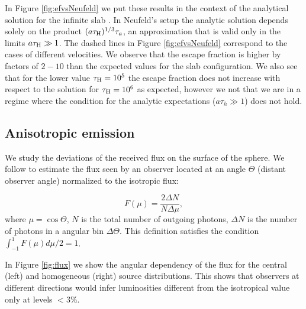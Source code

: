 \documentclass[usenatbib]{mn2e}
\begin{document}


In Figure \ref{fig:efvsNeufeld} we put these results in the context of
the analytical solution for the infinite slab \citep{Neufeld90}. In
Neufeld's setup the analytic solution depends solely on the product
$(a\tau_{\rm   H})^{1/3}\tau_{a}$, an approximation that is valid only
in the limits $a\tau_{\rm   H}\gg 1$. The dashed lines in Figure
\ref{fig:efvsNeufeld} correspond to the cases of different
velocities. We observe that the escape fraction is higher
by factors of $2-10$  than the expected values for the slab
configuration. We also see that for the lower value $\tau_{\rm
  H}=10^{5}$ the escape fraction does not increase with respect to the
solution for $\tau_{\rm H}=10^{6}$ as expected, however we not that we
are in a regime where the condition for the analytic expectations 
($a\tau_{h}\gg 1$) does not hold.



\subsection{Anisotropic emission}

We study the deviations of the received flux on the surface of the
sphere. We follow \cite{Zheng2013} to estimate the flux seen by an
observer located at an angle $\Theta$ (distant observer angle)
normalized to the isotropic flux:

\begin{equation}
F(\mu) = \frac{2\Delta N}{N\Delta \mu}, 
\end{equation}
%
where $\mu=\cos\Theta$, $N$ is the total number of outgoing photons,
$\Delta N$ is the number of photons in a angular bin $\Delta
\Theta$. This definition satisfies the condition
$\int_{-1}^{1}F(\mu)d\mu/2=1$. 

In Figure \ref{fig:flux} we show the angular dependency of the flux for the
central (left) and homogeneous (right) source distributions. This
shows that observers at different directions would infer luminosities
different from the isotropical value only at levels $< 3\%$. 
\end{document}
